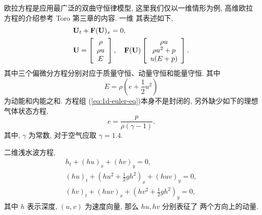 \begin{example}
  欧拉方程是应用最广泛的双曲守恒律模型, 这里我们仅以一维情形为例,
  高维欧拉方程的介绍参考 Toro \cite{Toro2009} 第三章的内容. 一维
  其表述如下,
  \begin{equation}
    \label{eq:1d-euler-eq}
    \begin{aligned}
      &{\bf{U}}_{t} + {\bf{F}}({\bf{U}})_{x} = 0,\\
      &{\bf{U}} = \left[
        \begin{array}{c}
          \rho\\
          \rho u\\
          E
        \end{array}
      \right], \quad
      {\bf{F}}({\bf{U}})\left[
        \begin{array}{c}
          \rho u\\
          \rho u^{2} + p\\
          u(E + p)
        \end{array}
      \right].
    \end{aligned}
  \end{equation}
  其中三个偏微分方程分别对应于质量守恒、动量守恒和能量守恒. 其中
  \begin{equation}
    \label{eq:energy-euler}
    E = \rho \left( e + \frac{1}{2} u^{2} \right)
  \end{equation}
  为动能和内能之和. 方程组 (\ref{eq:1d-euler-eq})本身不是封闭的,
  另外缺少如下的理想气体状态方程,
  \begin{equation}
    \label{eq:idea-gas}
    e = \frac{p}{\rho (\gamma - 1)}.
  \end{equation}
  其中, $\gamma$ 为常数, 对于空气应取 $\gamma = 1.4$.
\end{example}
\begin{example}
  二维浅水波方程,
  \begin{equation}
    \label{eq:shallow-water-equation}
    \begin{aligned}
      h_{t} + (hu)_{x} + (hv)_{y} = 0,\\
      (hu)_{t}+ \left( hu^{2} + \frac{1}{2}gh^{2} \right)_{x} +
      (huv)_{y} = 0,\\
      (hv)_{t} + (huv)_{x} + \left( hv^{2} + \frac{1}{2}
        gh^{2}\right)_{y} = 0,
    \end{aligned}
  \end{equation}
  其中 $h$ 表示深度, $(u,v)$ 为速度向量, 那么 $hu, hv$ 分别表征了
  两个方向上的动量.
\end{example}

